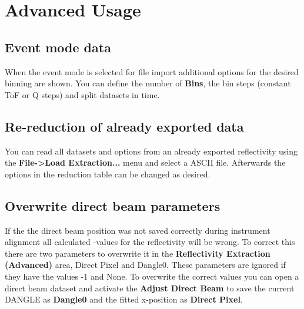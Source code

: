 \chapter{Advanced Usage}
\label{chap:advanced_usage}
  \section{Event mode data}
    When the event mode is selected for file import additional options for the desired binning are shown. You can define the number of \textbf{Bins}, the bin steps (constant ToF or Q steps) and split datasets in time.
  
  \section{Re-reduction of already exported data}
    You can read all datasets and options from an already exported reflectivity using the \textbf{File->Load Extraction...} menu and select a ASCII file. 
    Afterwards the options in the reduction table can be changed as desired.

  \section{Overwrite direct beam parameters}
    If the the direct beam position was not saved correctly during instrument alignment all calculated \Qz-values for the reflectivity will be wrong.
    To correct this there are two parameters to overwrite it in the \textbf{Reflectivity Extraction (Advanced)} area, Direct Pixel and Dangle0.
    These parameters are ignored if they have the values -1 and None.
    To overwrite the correct values you can open a direct beam dataset and activate the  \textbf{Adjust Direct Beam}  to save the current DANGLE as \textbf{Dangle0} and the fitted x-position as \textbf{Direct Pixel}.
  
  \clearpage
